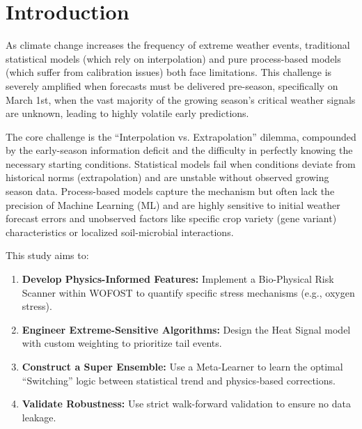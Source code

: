 \section{Introduction}

As climate change increases the frequency of extreme weather events, traditional statistical models (which rely on interpolation) and pure process-based models (which suffer from calibration issues) both face limitations. This challenge is severely amplified when forecasts must be delivered pre-season, specifically on March 1st, when the vast majority of the growing season's critical weather signals are unknown, leading to highly volatile early predictions.

The core challenge is the ``Interpolation vs. Extrapolation'' dilemma, compounded by the early-season information deficit and the difficulty in perfectly knowing the necessary starting conditions. Statistical models fail when conditions deviate from historical norms (extrapolation) and are unstable without observed growing season data. Process-based models capture the mechanism but often lack the precision of Machine Learning (ML) and are highly sensitive to initial weather forecast errors and unobserved factors like specific crop variety (gene variant) characteristics or localized soil-microbial interactions.

This study aims to:
\begin{enumerate}
    \item \textbf{Develop Physics-Informed Features:} Implement a Bio-Physical Risk Scanner within WOFOST to quantify specific stress mechanisms (e.g., oxygen stress).
    \item \textbf{Engineer Extreme-Sensitive Algorithms:} Design the Heat Signal model with custom weighting to prioritize tail events.
    \item \textbf{Construct a Super Ensemble:} Use a Meta-Learner to learn the optimal ``Switching'' logic between statistical trend and physics-based corrections.
    \item \textbf{Validate Robustness:} Use strict walk-forward validation to ensure no data leakage.
\end{enumerate}
